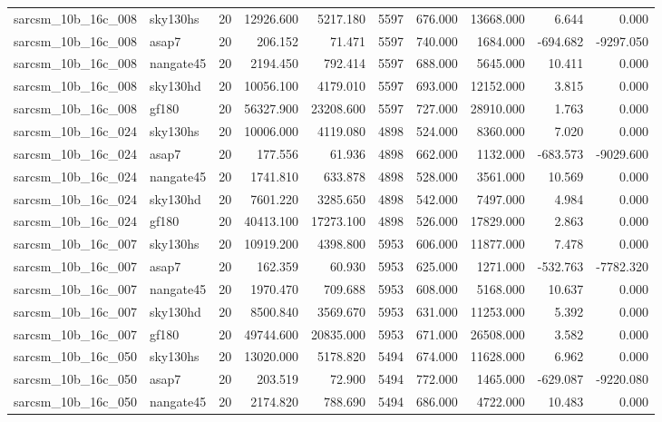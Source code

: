 \documentclass{article}
\begin{document}
\begin{longtable}{llrrrrrrrr}
sarcsm\_10b\_16c\_008 & sky130hs & 20 & 12926.600 & 5217.180 & 5597 & 676.000 & 13668.000 & 6.644 & 0.000 \\
sarcsm\_10b\_16c\_008 & asap7 & 20 & 206.152 & 71.471 & 5597 & 740.000 & 1684.000 & -694.682 & -9297.050 \\
sarcsm\_10b\_16c\_008 & nangate45 & 20 & 2194.450 & 792.414 & 5597 & 688.000 & 5645.000 & 10.411 & 0.000 \\
sarcsm\_10b\_16c\_008 & sky130hd & 20 & 10056.100 & 4179.010 & 5597 & 693.000 & 12152.000 & 3.815 & 0.000 \\
sarcsm\_10b\_16c\_008 & gf180 & 20 & 56327.900 & 23208.600 & 5597 & 727.000 & 28910.000 & 1.763 & 0.000 \\
sarcsm\_10b\_16c\_024 & sky130hs & 20 & 10006.000 & 4119.080 & 4898 & 524.000 & 8360.000 & 7.020 & 0.000 \\
sarcsm\_10b\_16c\_024 & asap7 & 20 & 177.556 & 61.936 & 4898 & 662.000 & 1132.000 & -683.573 & -9029.600 \\
sarcsm\_10b\_16c\_024 & nangate45 & 20 & 1741.810 & 633.878 & 4898 & 528.000 & 3561.000 & 10.569 & 0.000 \\
sarcsm\_10b\_16c\_024 & sky130hd & 20 & 7601.220 & 3285.650 & 4898 & 542.000 & 7497.000 & 4.984 & 0.000 \\
sarcsm\_10b\_16c\_024 & gf180 & 20 & 40413.100 & 17273.100 & 4898 & 526.000 & 17829.000 & 2.863 & 0.000 \\
sarcsm\_10b\_16c\_007 & sky130hs & 20 & 10919.200 & 4398.800 & 5953 & 606.000 & 11877.000 & 7.478 & 0.000 \\
sarcsm\_10b\_16c\_007 & asap7 & 20 & 162.359 & 60.930 & 5953 & 625.000 & 1271.000 & -532.763 & -7782.320 \\
sarcsm\_10b\_16c\_007 & nangate45 & 20 & 1970.470 & 709.688 & 5953 & 608.000 & 5168.000 & 10.637 & 0.000 \\
sarcsm\_10b\_16c\_007 & sky130hd & 20 & 8500.840 & 3569.670 & 5953 & 631.000 & 11253.000 & 5.392 & 0.000 \\
sarcsm\_10b\_16c\_007 & gf180 & 20 & 49744.600 & 20835.000 & 5953 & 671.000 & 26508.000 & 3.582 & 0.000 \\
sarcsm\_10b\_16c\_050 & sky130hs & 20 & 13020.000 & 5178.820 & 5494 & 674.000 & 11628.000 & 6.962 & 0.000 \\
sarcsm\_10b\_16c\_050 & asap7 & 20 & 203.519 & 72.900 & 5494 & 772.000 & 1465.000 & -629.087 & -9220.080 \\
sarcsm\_10b\_16c\_050 & nangate45 & 20 & 2174.820 & 788.690 & 5494 & 686.000 & 4722.000 & 10.483 & 0.000 \\

\end{longtable}
\end{document}
